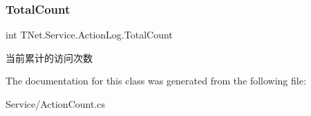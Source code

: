 \subsubsection{\texorpdfstring{Total\+Count}{TotalCount}}
{\footnotesize\ttfamily int T\+Net.\+Service.\+Action\+Log.\+Total\+Count\hspace{0.3cm}{\ttfamily [get]}}



当前累计的访问次数 



The documentation for this class was generated from the following file\+:\begin{DoxyCompactItemize}
\item 
Service/Action\+Count.\+cs\end{DoxyCompactItemize}

